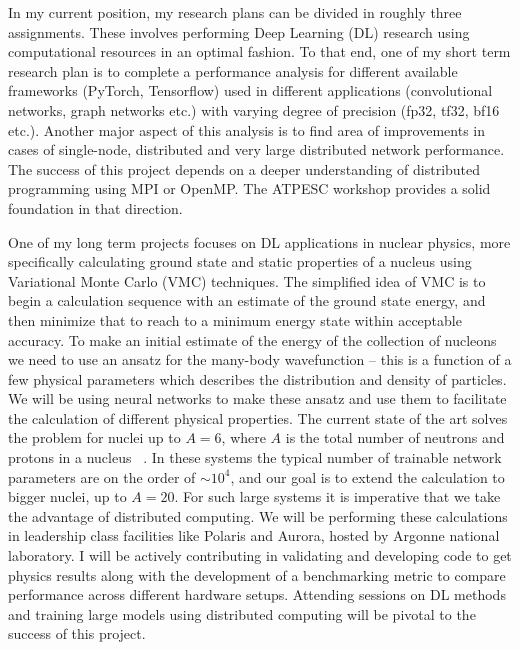 \documentclass{article}
\begin{document}
In my current position, my research plans can be divided in roughly three 
assignments. These involves performing Deep Learning (DL) research using 
computational resources in an optimal fashion. To that end, one of my short 
term research plan is to complete a performance analysis for different available
frameworks (PyTorch, Tensorflow) used in different applications (convolutional
networks, graph networks etc.) with varying degree of precision (fp32, tf32, 
bf16 etc.). Another major aspect of this analysis is to find area
of improvements in cases of single-node, distributed and very large distributed
network performance. The success of this project depends on a deeper 
understanding of distributed programming using MPI or OpenMP. The ATPESC 
workshop provides a solid foundation in that direction.

One of my long term projects focuses on DL applications in nuclear physics, more
specifically calculating ground state and static properties of a nucleus using
Variational Monte Carlo (VMC) techniques. The simplified idea of VMC is to 
begin a calculation sequence with an estimate of the ground state energy, and
then minimize that to reach to a minimum energy state within acceptable 
accuracy. To make an initial estimate of the energy of the collection of 
nucleons we need to use an ansatz for the many-body wavefunction -- this is a
function of a few physical parameters which describes the distribution and 
density of particles. We will be using neural networks to make these ansatz
and use them to facilitate the calculation of different physical properties. 
The current state of the art solves the problem for nuclei up to $A=6$, where 
$A$ is the total number of neutrons and protons in a nucleus
~\cite{Adams:2021, Gnech:2022}. In these systems the typical number of trainable
network parameters are on the order of $\sim 10^4$, and our goal is to extend
the calculation to bigger nuclei, up to $A=20$. For such large systems it is
imperative that we take the advantage of distributed computing. We will be 
performing these calculations in leadership class facilities like Polaris and
Aurora, hosted by Argonne national laboratory. I will be actively contributing 
in validating and developing code to get physics results along with the
development of a benchmarking metric to compare performance across different
hardware setups. Attending sessions on DL methods and training large models
using distributed computing will be pivotal to the success of this project. 
\end{document}
